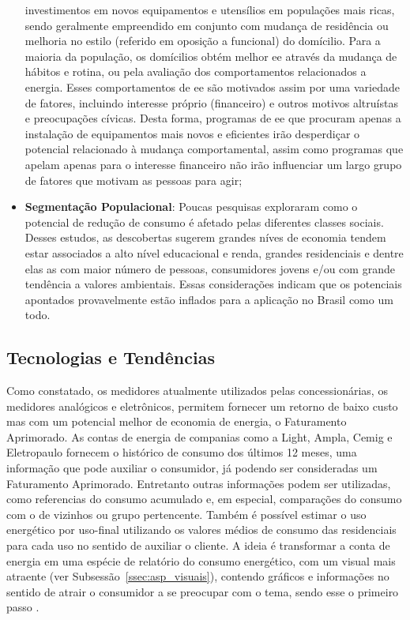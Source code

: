 \begin{itemize}
investimentos em novos equipamentos e utensílios em populações mais ricas, sendo
geralmente empreendido em conjunto com mudança de residência ou melhoria no
estilo (referido em oposição a funcional) do domícilio. Para a maioria da
população, os domícilios obtém melhor \gls{ee} através da mudança de hábitos e 
rotina, ou pela avaliação dos comportamentos relacionados a energia. Esses
comportamentos de \gls{ee} são motivados assim por uma variedade de fatores,
incluindo interesse próprio (financeiro) e outros motivos altruístas e
preocupações cívicas. Desta forma, programas de \gls{ee} que procuram apenas 
a instalação de equipamentos mais novos e eficientes irão 
desperdiçar o potencial relacionado à mudança comportamental, assim como
programas que apelam apenas para o interesse financeiro não irão influenciar um
largo grupo de fatores que motivam as pessoas para agir;
\item \textbf{Segmentação Populacional}: Poucas pesquisas exploraram como o
potencial de redução de consumo é afetado pelas diferentes classes sociais.
Desses estudos, as descobertas sugerem grandes níves de economia tendem estar
associados a alto nível educacional e renda, grandes residenciais e dentre elas
as com maior número de pessoas, consumidores jovens e/ou com grande tendência a
valores ambientais. Essas considerações indicam que os potenciais apontados
provavelmente estão inflados para a aplicação no Brasil como um todo.
\end{itemize} 

\subsection{Tecnologias e Tendências}
\label{ssec:ret_tec}

Como constatado, os medidores atualmente utilizados pelas 
concessionárias, os medidores analógicos e eletrônicos, permitem fornecer um 
retorno de baixo custo mas com um potencial melhor de economia de energia, 
o Faturamento Aprimorado. As contas de energia de companias como a Light,
Ampla, Cemig e Eletropaulo fornecem o histórico de consumo dos últimos 12 meses,
uma informação que pode auxiliar o consumidor, já podendo ser consideradas um 
Faturamento Aprimorado. Entretanto outras informações podem ser utilizadas, 
como referencias do consumo acumulado e, em especial, comparações do consumo 
com o de vizinhos ou grupo pertencente. Também é possível estimar o uso 
energético por uso-final utilizando os valores médios de consumo das residenciais
para cada uso no sentido de auxiliar o cliente. A ideia é
transformar a conta de energia em uma espécie de relatório do consumo energético,
com um visual mais atraente (ver Subsessão~\ref{ssec:asp_visuais}), 
contendo gráficos e informações no sentido de atrair o consumidor a se 
preocupar com o tema, sendo esse o primeiro passo \cite{2009_epri}.

